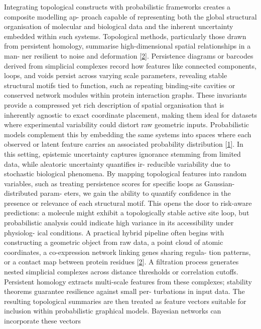 \documentclass[
]{article}
\begin{document}
Integrating topological constructs with probabilistic frameworks creates
a composite modelling ap- proach capable of representing both the global
structural organisation of molecular and biological data and the
inherent uncertainty embedded within such systems. Topological methods,
particularly those drawn from persistent homology, summarise
high-dimensional spatial relationships in a man- ner resilient to noise
and deformation {[}\protect\hyperlink{_bookmark42}{2}{]}. Persistence
diagrams or barcodes derived from simplicial complexes record how
features like connected components, loops, and voids persist across
varying scale parameters, revealing stable structural motifs tied to
function, such as repeating binding-site cavities or conserved network
modules within protein interaction graphs. These invariants provide a
compressed yet rich description of spatial organisation that is
inherently agnostic to exact coordinate placement, making them ideal for
datasets where experimental variability could distort raw geometric
inputs. Probabilistic models complement this by embedding the same
systems into spaces where each observed or latent feature carries an
associated probability distribution
{[}\protect\hyperlink{_bookmark41}{1}{]}. In this setting, epistemic
uncertainty captures ignorance stemming from limited data, while
aleatoric uncertainty quantifies ir- reducible variability due to
stochastic biological phenomena. By mapping topological features into
random variables, such as treating persistence scores for specific loops
as Gaussian-distributed param- eters, we gain the ability to quantify
confidence in the presence or relevance of each structural motif. This
opens the door to risk-aware predictions: a molecule might exhibit a
topologically stable active site loop, but probabilistic analysis could
indicate high variance in its accessibility under physiolog- ical
conditions. A practical hybrid pipeline often begins with constructing a
geometric object from raw data, a point cloud of atomic coordinates, a
co-expression network linking genes sharing regula- tion patterns, or a
contact map between protein residues
{[}\protect\hyperlink{_bookmark42}{2}{]}. A filtration process generates
nested simplicial complexes across distance thresholds or correlation
cutoffs. Persistent homology extracts multi-scale features from these
complexes; stability theorems guarantee resilience against small per-
turbations in input data. The resulting topological summaries are then
treated as feature vectors suitable for inclusion within probabilistic
graphical models. Bayesian networks can incorporate these vectors
\end{document}
